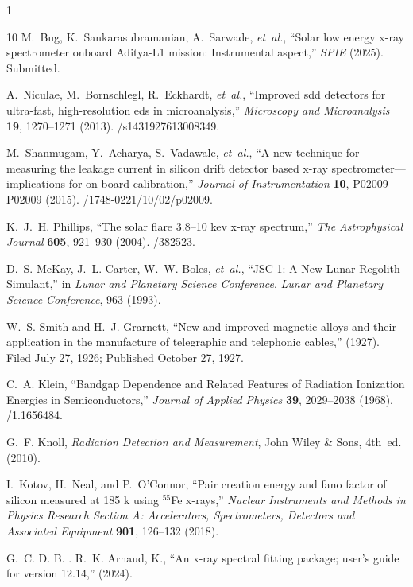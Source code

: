 \documentclass[12pt]{spieman}  %
\begin{document}
\begin{spacing}{1}
\begin{thebibliography}{10}
M.~Bug, K.~Sankarasubramanian, A.~Sarwade, {\em et~al.}, ``Solar low energy x-ray spectrometer onboard {Aditya-L1} mission: Instrumental aspect,'' {\em SPIE}   (2025).
\newblock Submitted.

A.~Niculae, M.~Bornschlegl, R.~Eckhardt, {\em et~al.}, ``Improved sdd detectors for ultra-fast, high-resolution eds in microanalysis,'' {\em Microscopy and Microanalysis} {\bf 19}, 1270–1271  (2013).
/s1431927613008349.

M.~Shanmugam, Y.~Acharya, S.~Vadawale, {\em et~al.}, ``A new technique for measuring the leakage current in silicon drift detector based x-ray spectrometer—implications for on-board calibration,'' {\em Journal of Instrumentation} {\bf 10}, P02009–P02009  (2015).
/1748-0221/10/02/p02009.

K.~J.~H. Phillips, ``The solar flare 3.8–10 kev x‐ray spectrum,'' {\em The Astrophysical Journal} {\bf 605}, 921–930  (2004).
/382523.

D.~S. {McKay}, J.~L. {Carter}, W.~W. {Boles}, {\em et~al.}, ``{JSC-1: A New Lunar Regolith Simulant},'' in {\em Lunar and Planetary Science Conference},  {\em Lunar and Planetary Science Conference}, 963  (1993).

W.~S. Smith and H.~J. Grarnett, ``New and improved magnetic alloys and their application in the manufacture of telegraphic and telephonic cables,''  (1927).
\newblock Filed July 27, 1926; Published October 27, 1927.

C.~A. {Klein}, ``{Bandgap Dependence and Related Features of Radiation Ionization Energies in Semiconductors},'' {\em Journal of Applied Physics} {\bf 39}, 2029--2038  (1968).
/1.1656484.

G.~F. Knoll, {\em Radiation Detection and Measurement}, John Wiley \& Sons, 4th~ed.  (2010).

I.~Kotov, H.~Neal, and P.~O’Connor, ``Pair creation energy and fano factor of silicon measured at 185 k using $^{55}$Fe x-rays,'' {\em Nuclear Instruments and Methods in Physics Research Section A: Accelerators, Spectrometers, Detectors and Associated Equipment} {\bf 901}, 126–132  (2018).

G.~C. D. B. . R.~K. Arnaud, K., ``An x-ray spectral fitting package; user’s guide for version 12.14,''  (2024).


\end{thebibliography}
\end{spacing}
\end{document}
